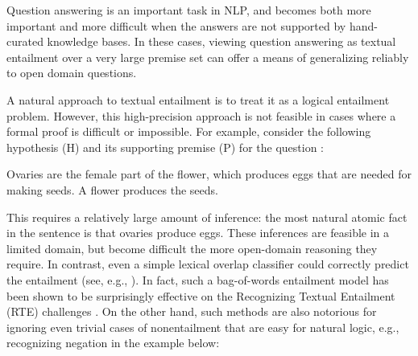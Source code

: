 Question answering is an important task in NLP, and becomes both
  more important and more difficult when the answers are not supported by
  hand-curated knowledge bases.
In these cases, viewing question answering as textual entailment over a
  very large premise set can offer a means of generalizing reliably to
  open domain questions.

A natural approach to textual entailment
  is to treat it as a logical entailment problem.
However, this high-precision approach is not feasible in cases
    where a formal proof is difficult or impossible.
For example, consider the following hypothesis (H) 
  and its supporting premise (P)
  for the question :

\entailmentExample
{Ovaries are the female part of the flower, which produces eggs that are needed for making seeds.}
{A flower produces the seeds.}

This requires a relatively large amount of inference:
  the most natural atomic fact in the sentence is that
  ovaries produce eggs.
These inferences are feasible in a limited domain, but become
  difficult the more open-domain reasoning they require.
In contrast, even a simple lexical overlap classifier could correctly predict
  the entailment (see, e.g., ).
In fact, such a bag-of-words entailment model has been shown to be surprisingly
  effective on the Recognizing Textual Entailment (RTE) challenges 
  \cite{key:2009maccartney-thesis}.
On the other hand, such methods are also notorious for ignoring even trivial 
  cases of nonentailment that are easy for natural logic, e.g., recognizing negation
  in the example below:

